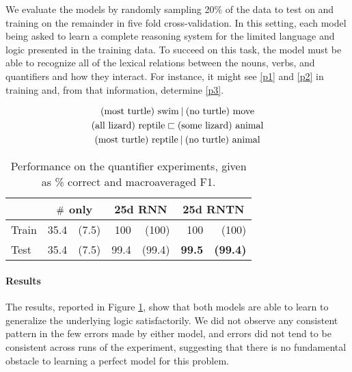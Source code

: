 
We evaluate the models by randomly sampling 20\% of the data to
test on and training on the remainder in five fold cross-validation.
In this setting, each model being asked to learn a
complete reasoning system for the limited language and logic presented
in the training data. To succeed on this task, the model must be able
to recognize all of the lexical relations between the nouns, verbs,
and quantifiers and how they interact. For instance, it might see
\eqref{p1} and \eqref{p2} in training and, from that information,
determine \eqref{p3}.

\vspace{-0.6cm}
\begin{gather}
  \text{(most turtle) swim} \mathbin{|} \text{(no turtle) move}\label{p1}
  \\
  \text{(all lizard) reptile} \sqsubset  \text{(some lizard) animal}\label{p2}
  \\
  \text{(most turtle) reptile} \mathbin{|} \text{(no turtle) animal}\label{p3}
\end{gather}\vspace{-0.8cm}

\begin{table}[tp]
  \centering \small
  \begin{tabular}{ l r@{ \ }r r@{ \ }r r@{ \ }r }
    \toprule
    ~&\multicolumn{2}{c}{$\mathbin{\#}$ only} & \multicolumn{2}{c}{25d RNN}  & \multicolumn{2}{c}{25d RNTN}\\
    \midrule
    Train & 35.4 &(7.5) &	100&		(100)&	100&	(100)\\	
    Test & 35.4 &(7.5) &	99.4&(99.4)& \textbf{99.5} & \textbf{(99.4)}\\
    \bottomrule
  \end{tabular}
  \caption{Performance on the quantifier experiments, given as \% correct and macroaveraged F1.}
  \label{qresultstable}
\end{table} 
%
%
\paragraph{Results} The results, reported in Figure \ref{qresultstable}, show that both models are able to learn to generalize the underlying logic satisfactorily. We did not observe any consistent pattern in the few errors made by either model, and errors did not tend to be consistent across runs of the experiment, suggesting that there is no fundamental obstacle to learning a perfect model for this problem.
